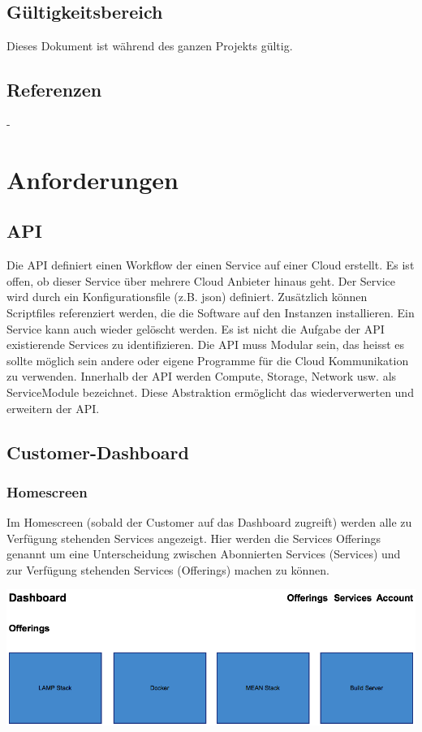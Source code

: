 \documentclass[11pt]{scrartcl}
\begin{document}
\subsection{Gültigkeitsbereich}
Dieses Dokument ist während des ganzen Projekts gültig.


\subsection{Referenzen}
-

\section{Anforderungen}
\subsection{API}
Die API definiert einen Workflow der einen Service auf einer Cloud erstellt. Es ist offen, ob dieser Service über mehrere Cloud Anbieter hinaus geht. Der Service wird durch ein Konfigurationsfile (z.B. json) definiert. Zusätzlich können Scriptfiles referenziert werden, die die Software auf den Instanzen installieren. Ein Service kann auch wieder gelöscht werden. Es ist nicht die Aufgabe der API existierende Services zu identifizieren. Die API muss Modular sein, das heisst es sollte möglich sein andere oder eigene Programme für die Cloud Kommunikation zu verwenden. Innerhalb der API werden Compute, Storage, Network usw. als ServiceModule bezeichnet. Diese Abstraktion ermöglicht das wiederverwerten und erweitern der API.
\newpage
\subsection{Customer-Dashboard}
\subsubsection{Homescreen}
Im Homescreen (sobald der Customer auf das Dashboard zugreift) werden alle zu 
Verfügung stehenden Services angezeigt.
Hier werden die Services Offerings genannt um eine Unterscheidung zwischen 
Abonnierten Services (Services) und zur Verfügung stehenden Services (Offerings) 
machen zu können.

\includegraphics[width=\textwidth]{homescreen_customer}
\end{document}
